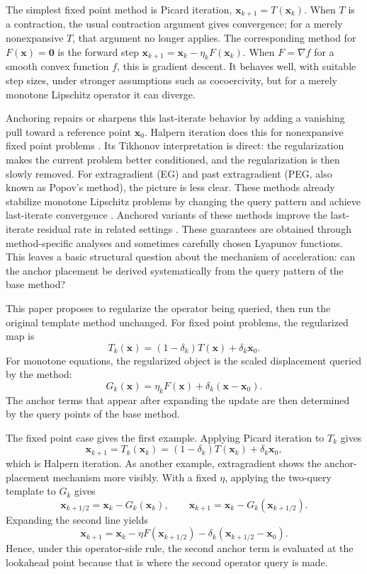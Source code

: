 \documentclass[letterpaper,11pt]{article}
\newcommand{\vect}[1]{\mathbf{#1}}
\begin{document}
The simplest fixed point method is Picard iteration,
\(\vect{x}_{k+1}=T(\vect{x}_k)\). When \(T\) is a contraction, the usual
contraction argument gives convergence; for a merely nonexpansive \(T\), that
argument no longer applies. The corresponding method for
\(F(\vect{x})=\vect{0}\) is the forward step
\(\vect{x}_{k+1}=\vect{x}_k-\eta_k F(\vect{x}_k)\). When
\(F=\nabla f\) for a smooth convex function \(f\), this is gradient descent.
It behaves well, with suitable step sizes, under stronger assumptions such as
cocoercivity, but for a merely monotone Lipschitz operator it can diverge.

Anchoring repairs or sharpens this last-iterate behavior by
adding a vanishing pull toward a reference point \(\vect{x}_0\). Halpern
iteration does this for nonexpansive fixed point problems
\cite{halpern1967fixed,browder1967convergence,wittmann1992approximation}. Its Tikhonov interpretation is
direct: the regularization makes the current problem better conditioned, and
the regularization is then slowly removed. For extragradient (EG) and past
extragradient (PEG, also known as Popov's method), the picture is less clear. These
methods already stabilize monotone Lipschitz problems by changing the query
pattern and achieve last-iterate convergence
\cite{korpelevich1976extragradient,popov1980modification,gorbunov2022extragradient,gorbunov2022last}.
Anchored variants of these methods improve the last-iterate residual rate in related settings
\cite{yoon2021accelerated,lee2021fast,boct2024extra,tran2021halpern,bot2025fast,tran2025accelerated,alcala2025stochastic}.
These guarantees are obtained through method-specific analyses and sometimes carefully
chosen Lyapunov functions. This leaves a basic structural question about the
mechanism of acceleration: can the anchor placement be derived systematically
from the query pattern of the base method?


This paper proposes to regularize the operator being queried,
then run the original template method unchanged. For fixed point problems, the
regularized map is
\[
    T_k(\vect{x})
    =
    (1-\delta_k)T(\vect{x})+\delta_k\vect{x}_0.
\]
For monotone equations, the regularized object is the scaled displacement
queried by the method:
\[
    G_k(\vect{x})
    =
    \eta_kF(\vect{x})+\delta_k(\vect{x}-\vect{x}_0).
\]
The anchor terms that appear after expanding the update are then determined by
the query points of the base method.

The fixed point case gives the first example. Applying Picard iteration to
\(T_k\) gives
\[
    \vect{x}_{k+1}
    =
    T_k(\vect{x}_k)
    =
    (1-\delta_k)T(\vect{x}_k)+\delta_k\vect{x}_0,
\]
which is Halpern iteration. As another example, extragradient shows the anchor-placement mechanism
more visibly. With a fixed \(\eta\), applying the two-query template to
\(G_k\) gives
\[
    \vect{x}_{k+1/2}
    =
    \vect{x}_k-G_k(\vect{x}_k),
    \qquad
    \vect{x}_{k+1}
    =
    \vect{x}_k-G_k(\vect{x}_{k+1/2}).
\]
Expanding the second line yields
\[
    \vect{x}_{k+1}
    =
    \vect{x}_k-\eta F(\vect{x}_{k+1/2})
    -\delta_k(\vect{x}_{k+1/2}-\vect{x}_0).
\]
Hence, under this operator-side rule, the second anchor term is evaluated at the
lookahead point because that is where the second operator query is made.
\end{document}
